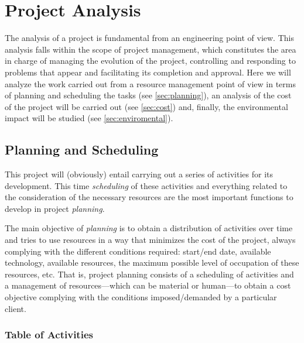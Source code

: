

\chapter{Project Analysis}\label{cha:analysis}



\drop The analysis of a project is fundamental from an engineering point of
view. This analysis falls within the scope of project management, which
constitutes the area in charge of managing the evolution of the project,
controlling and responding to problems that appear and facilitating its
completion and approval. Here we will analyze the work carried out from a
resource management point of view in terms of planning and scheduling the tasks
(see \vref{sec:planning}), an analysis of the cost of the project will be
carried out (see \vref{sec:cost}) and, finally, the environmental impact will
be studied (see \vref{sec:enviromental}).



\section{Planning and Scheduling}%
\label{sec:planning}

This project will (obviously) entail carrying out a series of activities for
its development. This time \emph{scheduling} of these activities and everything
related to the consideration of the necessary resources are the most important
functions to develop in project \emph{planning}.

The main objective of \emph{planning} is to obtain a distribution of activities
over time and tries to use resources in a way that minimizes the cost of the
project, always complying with the different conditions required: start/end
date, available technology, available resources, the maximum possible level of
occupation of these resources, etc. That is, project planning consists of a
scheduling of activities and a management of resources---which can be material
or human---to obtain a cost objective complying with the conditions
imposed/demanded by a particular client.


\subsection{Table of Activities}\label{sec:activities}

